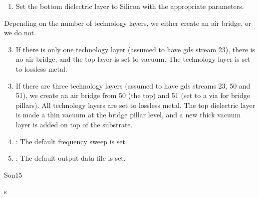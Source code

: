 \documentclass[letterpaper,10pt,english,openany]{sphinxmanual}
\begin{document}
\begin{fulllineitems}
\begin{fulllineitems}
\begin{enumerate}
\item {} 
Set the bottom dielectric layer to Silicon with the appropriate parameters.

\end{enumerate}

Depending on the number of technology layers, we either create an air bridge, or we do not.
\begin{enumerate}
\setcounter{enumi}{2}
\item {} 
If there is only one technology layer (assumed to have gds stream 23), there is no air bridge, and the top layer is set to vacuum. The technology layer is set to lossless metal.

\end{enumerate}
\begin{enumerate}
\setcounter{enumi}{2}
\item {} 
If there are three technology layers (assumed to have gds streams 23, 50 and 51), we create an air bridge from 50 (the top) and 51 (set to a via for bridge pillars). All technology layers are set to lossless metal. The top dielectric layer is made a thin vacuum at the bridge pillar level, and a new thick vacuum layer is added on top of the substrate.

\item {} 
{\hyperref[\detokenize{source/sonpy:sonpy.sonnet.setFrequencySweep}]{}}: The default frequency sweep is set.

\item {} 
{\hyperref[\detokenize{source/sonpy:sonpy.sonnet.setOutput}]{}}: The default output data file is set.

\end{enumerate}

\end{fulllineitems}


\end{fulllineitems}


\begin{sphinxthebibliography}{Son15}
\end{sphinxthebibliography}


\renewcommand{\indexname}{Python Module Index}
\begin{sphinxtheindex}
\def\bigletter#1{{\Large\sffamily#1}\nopagebreak\vspace{1mm}}
\bigletter{s}
\item {}
\end{sphinxtheindex}

\renewcommand{\indexname}{Index}
\printindex
\end{document}
